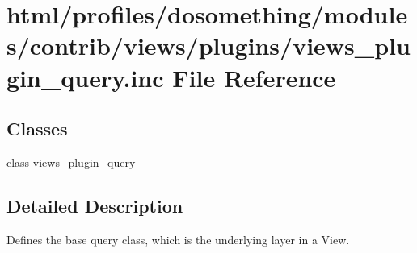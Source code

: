 \hypertarget{views__plugin__query_8inc}{
\section{html/profiles/dosomething/modules/contrib/views/plugins/views\_\-plugin\_\-query.inc File Reference}
\label{views__plugin__query_8inc}
}
\subsection*{Classes}
\begin{DoxyCompactItemize}
\item 
class \hyperlink{classviews__plugin__query}{views\_\-plugin\_\-query}
\end{DoxyCompactItemize}


\subsection{Detailed Description}
Defines the base query class, which is the underlying layer in a View. 